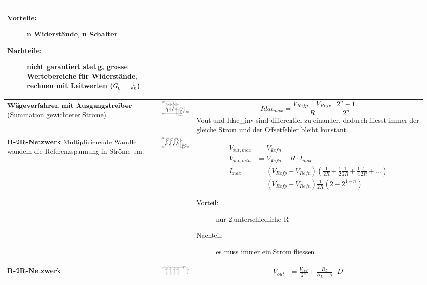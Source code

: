 \begin{longtable}{|p{3cm}|c|p{8.6cm}|}
	  \begin{description}
  		\item[Vorteile:] n Widerstände, n Schalter
  		\item[Nachteile:] nicht garantiert stetig, grosse Wertebereiche für Widerstände, rechnen mit Leitwerten ($G_0 = \frac{1}{8R}$)
	  \end{description}
	\\ \hline
	\textbf{Wägeverfahren mit Ausgangstreiber} \newline
  (Summation gewichteter Ströme)
	& \includegraphics[width=5cm, valign=t]{./pictures/praktisch.png}
	& \[ Idac_{max}=\frac{V_{Refp}-V_{Refn}}{R} \cdot \frac{2^n-1}{2^n} \] \newline
    Vout und Idac\_inv sind differentiel zu einander, dadurch fliesst immer der gleiche Strom
    und der Offsetfehler bleibt konstant.
	\\ \hline
	\textbf{R-2R-Netzwerk \hartl{462}} Multiplizierende Wandler wandeln die Referenzspannung in Ströme um.
	& \includegraphics[width=5.5cm, valign=t]{./pictures/r2rnetzwerk.png}
	& {
	\begin{align*}
		V_{out,max} &= V_{Refn} \\
		V_{out,min} &= V_{Refn} - R \cdot I_{max}\\
		I_{max}		&= (V_{Refp} - V_{Refn}) (\frac{1}{2R} + \frac{1}{2}\frac{1}{2R} + \frac{1}{4} \frac{1}{2R} + \ldots) \\
					&= (V_{Refp} - V_{Refn})\frac{1}{2R}(2-2^{1-n})
	\end{align*}}
  
  \begin{description}
    \item[Vorteil:] nur 2 unterschiedliche R
    \item[Nachteil:] es muss immer ein Strom fliessen
  \end{description}
  
	\\ \hline
	\textbf{R-2R-Netzwerk}
	& \includegraphics[width=5cm, valign=t]{pictures/r2r.png}
	& {
	\begin{align*}
		V_{out}&= \frac{V_{ref}}{2^n} + \frac{R_L}{R_L + R} \cdot D
	\end{align*}}
  

\end{longtable}
